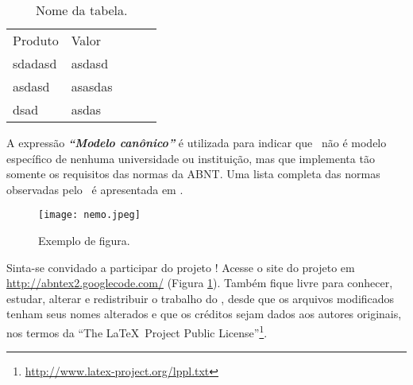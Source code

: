 \documentclass[
12pt,				%
oneside,			%
a4paper,			%
english,			%
french,				%
spanish,			%
brazil,				%
]{abntex2}
\begin{document}
\begin{table}[hbt] %
    \begin{center}
        \caption{Nome da tabela.} %
        \begin{tabular}{|l|l|lll}
            \cline{1-2}
            Produto & Valor   &  &  &  \\ \cline{1-2}\cline{1-2}
            sdadasd & asdasd  &  &  &  \\ \cline{1-2}
            asdasd  & asasdas &  &  &  \\ \cline{1-2}
            dsad    & asdas   &  &  &  \\ \cline{1-2}
        \end{tabular}
    \end{center}
\end{table}

A expressão \textit{\textbf{``Modelo canônico''}} é utilizada para indicar que \abnTeX\ não é
modelo específico de nenhuma universidade ou instituição, mas que implementa tão
somente os requisitos das normas da ABNT. Uma lista completa das normas
observadas pelo \abnTeX\ é apresentada em . %

\begin{figure} [hbt] 
    \label{figura1} 
    \caption{Exemplo de figura.}
    \texttt{[image: nemo.jpeg]} %
\end{figure}


Sinta-se convidado a participar do projeto \abnTeX! Acesse o site do projeto em
\url{http://abntex2.googlecode.com/} (Figura \ref{figura1}). Também fique livre para conhecer,
estudar, alterar e redistribuir o trabalho do \abnTeX, desde que os arquivos
modificados tenham seus nomes alterados e que os créditos sejam dados aos
autores originais, nos termos da ``The \LaTeX\ Project Public
License''\footnote{\url{http://www.latex-project.org/lppl.txt}}.
\end{document}
